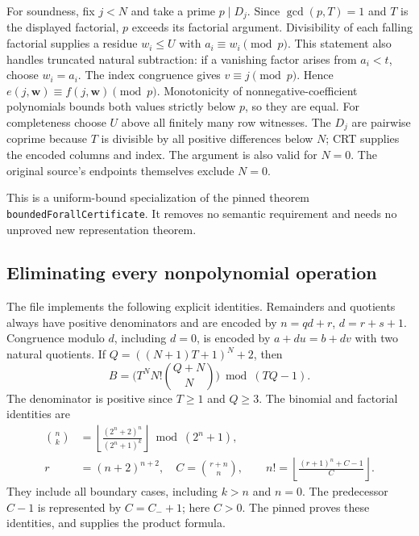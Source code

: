 \documentclass[11pt]{article}
\begin{document}
For soundness, fix $j<N$ and take a prime $p\mid D_j$. Since
$\gcd(p,T)=1$ and $T$ is the displayed factorial, $p$ exceeds its factorial
argument. Divisibility of each falling factorial supplies a residue
$w_i\leq U$ with $a_i\equiv w_i\pmod p$. This statement also handles
truncated natural subtraction: if a vanishing factor arises from
$a_i<t$, choose $w_i=a_i$. The index congruence gives $v\equiv j\pmod p$.
Hence $e(j,\boldsymbol w)\equiv f(j,\boldsymbol w)\pmod p$.
Monotonicity of nonnegative-coefficient polynomials bounds both values
strictly below $p$, so they are equal. For completeness choose $U$ above
all finitely many row witnesses. The $D_j$ are pairwise coprime because
$T$ is divisible by all positive differences below $N$; CRT supplies the
encoded columns and index. The argument is also valid for $N=0$.
The original source's endpoints themselves exclude $N=0$.

This is a uniform-bound specialization of the pinned theorem
\texttt{boundedForallCertificate}. It removes no semantic requirement and
needs no unproved new representation theorem.

\subsection{Eliminating every nonpolynomial operation}

The file  implements the following explicit
identities. Remainders and quotients always have positive denominators
and are encoded by $n=qd+r$, $d=r+s+1$. Congruence modulo $d$, including
$d=0$, is encoded by $a+du=b+dv$ with two natural quotients. If
$Q=((N+1)T+1)^N+2$, then
\[
 B=\bigl(T^N N!\binom{Q+N}{N}\bigr)\bmod(TQ-1).
\]
The denominator is positive since $T\geq1$ and $Q\geq3$.
The binomial and factorial identities are
\begin{align*}
 \binom nk&=\left\lfloor\frac{(2^n+2)^n}{(2^n+1)^k}\right\rfloor
                \bmod(2^n+1),\\
 r&=(n+2)^{n+2},\quad C=\binom{r+n}{n},\qquad
 n!=\left\lfloor\frac{(r+1)^n+C-1}{C}\right\rfloor.
\end{align*}
They include all boundary cases, including $k>n$ and $n=0$.
The predecessor $C-1$ is represented by $C=C_-+1$; here $C>0$.
The pinned  proves these identities,
and  supplies the product formula.
\end{document}
